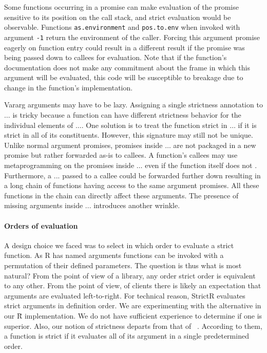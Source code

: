 \documentclass[review,nonacm,screen,acmsmall,anonymous=true]{acmart}
\newcommand{\code}[1]{\lstinline |#1|\xspace}
\newcommand{\strictr}{{\sf StrictR}\xspace}
\renewcommand{\Rsh}{{\sf\u R}\xspace}
\begin{document}
Some functions occurring in a promise can make evaluation of the promise
sensitive to its position on the call stack, and strict evaluation would be
observable. Functions \code{as.environment} and \code{pos.to.env} when invoked
with argument \code{-1} return the environment of the caller. Forcing this
argument promise eagerly on function entry could result in a different result if
the promise was being passed down to callees for evaluation. Note that if the
function's documentation does not make any commitment about the frame in which
this argument will be evaluated, this code will be susceptible to breakage due
to change in the function's implementation.

Vararg arguments may have to be lazy. Assigning a single strictness annotation
to $\dots$ is tricky because a function can have different strictness behavior
for the individual elements of $\dots$. One solution is to treat the function
strict in $\dots$ if it is strict in all of its constituents. However, this
signature may still not be unique. Unlike normal argument promises, promises
inside $\dots$ are not packaged in a new promise but rather forwarded as-is to
callees. A function's callees may use metaprogramming on the promises inside
$\dots$ even if the function itself does not . Furthermore, a $...$ passed to a
callee could be forwarded further down resulting in a long chain of functions
having access to the same argument promises. All these functions in the chain
can directly affect these arguments. The presence of missing arguments inside
$...$ introduces another wrinkle.

\paragraph{Orders of evaluation} A design choice we faced was to select
in which order to evaluate a strict function. As R has named arguments functions
can be invoked with a permutation of their defined parameters. The question is
thus what is most natural? From the point of view of a library, any order strict
order is equivalent to any other. From the point of view, of clients there is
likely an expectation that arguments are evaluated left-to-right. For technical
reason, \strictr evaluates strict arguments in definition order. We are
experimenting with the alternative in our \Rsh implementation. We do not have
sufficient experience to determine if one is superior.
Also, our notion of strictness departs from that of ~\citet{oopsla19b}. According to
them, a function is strict if it evaluates all of its argument in a single
predetermined order.
\end{document}
